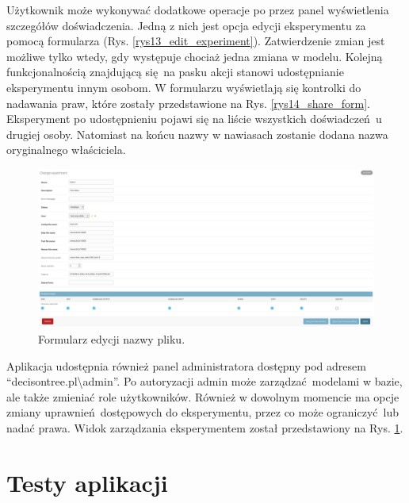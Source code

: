 Użytkownik może wykonywać dodatkowe operacje po przez panel wyświetlenia szczegółów doświadczenia. Jedną z nich jest opcja edycji eksperymentu za pomocą formularza (Rys. \ref{rys13_edit_experiment}). Zatwierdzenie zmian jest możliwe tylko wtedy, gdy występuje chociaż jedna zmiana w modelu.  Kolejną funkcjonalnością znajdującą się na pasku akcji stanowi udostępnianie eksperymentu innym osobom. W formularzu wyświetlają się kontrolki do nadawania praw, które zostały przedstawione na Rys. \ref{rys14_share_form}. Eksperyment po udostępnieniu pojawi się na liście wszystkich doświadczeń u drugiej osoby. Natomiast na końcu nazwy w nawiasach zostanie dodana nazwa oryginalnego właściciela. 


\begin{figure}[htb]
	\centering
	\includegraphics[width=15cm]{grafika/admin_exp.eps}
	\caption{Formularz edycji nazwy pliku.}
	\label{rys20_admin_exp}
\end{figure}

Aplikacja udostępnia również panel administratora dostępny pod adresem \enquote{decisontree.pl\textbackslash{admin}}. Po autoryzacji admin może zarządzać modelami w bazie, ale także zmieniać role użytkowników. Również w dowolnym momencie ma opcje zmiany uprawnień dostępowych do eksperymentu, przez co może ograniczyć lub nadać prawa. Widok zarządzania eksperymentem został przedstawiony na Rys. \ref{rys20_admin_exp}.





\section{Testy aplikacji}